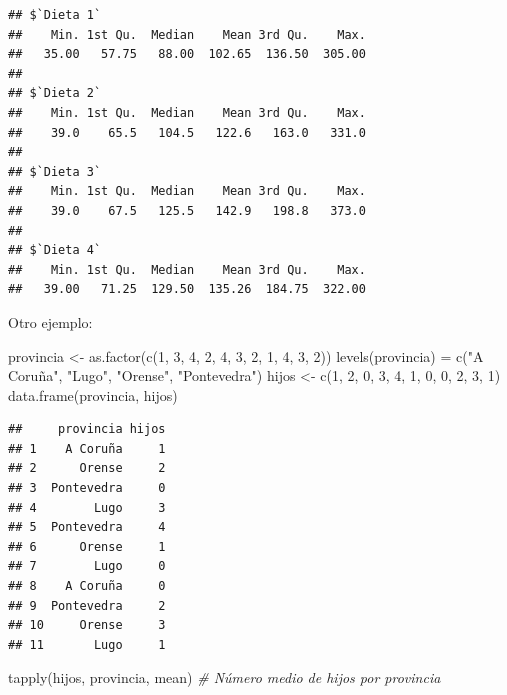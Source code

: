 \documentclass[
]{book}
\newenvironment{Shaded}{\begin{snugshade}}{\end{snugshade}}
\newcommand{\CommentTok}[1]{\textcolor[rgb]{0.56,0.35,0.01}{\textit{#1}}}
\newcommand{\DecValTok}[1]{\textcolor[rgb]{0.00,0.00,0.81}{#1}}
\newcommand{\FunctionTok}[1]{\textcolor[rgb]{0.00,0.00,0.00}{#1}}
\newcommand{\NormalTok}[1]{#1}
\newcommand{\OtherTok}[1]{\textcolor[rgb]{0.56,0.35,0.01}{#1}}
\newcommand{\StringTok}[1]{\textcolor[rgb]{0.31,0.60,0.02}{#1}}
\theoremstyle{break}
\begin{document}
\begin{verbatim}
## $`Dieta 1`
##    Min. 1st Qu.  Median    Mean 3rd Qu.    Max. 
##   35.00   57.75   88.00  102.65  136.50  305.00 
## 
## $`Dieta 2`
##    Min. 1st Qu.  Median    Mean 3rd Qu.    Max. 
##    39.0    65.5   104.5   122.6   163.0   331.0 
## 
## $`Dieta 3`
##    Min. 1st Qu.  Median    Mean 3rd Qu.    Max. 
##    39.0    67.5   125.5   142.9   198.8   373.0 
## 
## $`Dieta 4`
##    Min. 1st Qu.  Median    Mean 3rd Qu.    Max. 
##   39.00   71.25  129.50  135.26  184.75  322.00
\end{verbatim}

Otro ejemplo:

\begin{Shaded}
\begin{Highlighting}[]
\NormalTok{provincia }\OtherTok{\textless{}{-}} \FunctionTok{as.factor}\NormalTok{(}\FunctionTok{c}\NormalTok{(}\DecValTok{1}\NormalTok{, }\DecValTok{3}\NormalTok{, }\DecValTok{4}\NormalTok{, }\DecValTok{2}\NormalTok{, }\DecValTok{4}\NormalTok{, }\DecValTok{3}\NormalTok{, }\DecValTok{2}\NormalTok{, }\DecValTok{1}\NormalTok{, }\DecValTok{4}\NormalTok{, }\DecValTok{3}\NormalTok{, }\DecValTok{2}\NormalTok{))}
\FunctionTok{levels}\NormalTok{(provincia) }\OtherTok{=} \FunctionTok{c}\NormalTok{(}\StringTok{"A Coruña"}\NormalTok{, }\StringTok{"Lugo"}\NormalTok{, }\StringTok{"Orense"}\NormalTok{, }\StringTok{"Pontevedra"}\NormalTok{)}
\NormalTok{hijos }\OtherTok{\textless{}{-}} \FunctionTok{c}\NormalTok{(}\DecValTok{1}\NormalTok{, }\DecValTok{2}\NormalTok{, }\DecValTok{0}\NormalTok{, }\DecValTok{3}\NormalTok{, }\DecValTok{4}\NormalTok{, }\DecValTok{1}\NormalTok{, }\DecValTok{0}\NormalTok{, }\DecValTok{0}\NormalTok{, }\DecValTok{2}\NormalTok{, }\DecValTok{3}\NormalTok{, }\DecValTok{1}\NormalTok{)}
\FunctionTok{data.frame}\NormalTok{(provincia, hijos)}
\end{Highlighting}
\end{Shaded}

\begin{verbatim}
##     provincia hijos
## 1    A Coruña     1
## 2      Orense     2
## 3  Pontevedra     0
## 4        Lugo     3
## 5  Pontevedra     4
## 6      Orense     1
## 7        Lugo     0
## 8    A Coruña     0
## 9  Pontevedra     2
## 10     Orense     3
## 11       Lugo     1
\end{verbatim}

\begin{Shaded}
\begin{Highlighting}[]
\FunctionTok{tapply}\NormalTok{(hijos, provincia, mean) }\CommentTok{\# Número medio de hijos por provincia}
\end{Highlighting}
\end{Shaded}
\end{document}
